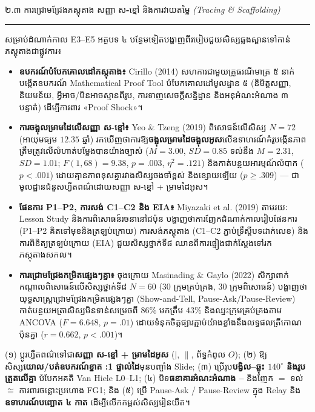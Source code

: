 \documentclass[a4paper,12pt]{article}
\newcommand{\en}[1]{{\TimesEn #1}}
\newcommand{\enbf}[1]{{\TimesEn\textbf{#1}}}
\newcommand{\enit}[1]{{\TimesEn\textit{#1}}}
\newcommand{\cnum}[1]{{\fontsize{10.5pt}{12pt}\selectfont\ding{\numexpr181+#1\relax}}}
\newcommand{\cg}{\ensuremath{\cong}}
\newcommand{\subsec}[1]{%
  \Needspace{1.3cm}%
  \vspace{0pt}%
  {\muol\fontsize{11.5pt}{18.5pt}\selectfont #1}\par
  \vspace{1pt}\hrule height 0.5pt\vspace{2pt}%
}
\begin{document}
\subsec{២.៣ ការជ្រោមជ្រែងភស្តុតាង សញ្ញា ស\enbf{-}ខ្មៅ និងការវាយតម្លៃ \enit{(Tracing \& Scaffolding)}}

សម្រាប់ដំណាក់កាល \en{E3--E5} អត្ថបទ ៤ បន្ថែមទៀតបង្ហាញពីរបៀបជួយសិស្សឆ្លងស្ពានទៅកាន់ភស្តុតាងជាផ្លូវការ៖
\begin{itemize}[leftmargin=0.50cm, topsep=3pt, itemsep=4pt, parsep=0pt]
  \item \textbf{ឧបករណ៍បំបែកគោលដៅភស្តុតាង៖} \en{Cirillo (2014)} សហការជាមួយគ្រូធរណីមាត្រ ៥ នាក់ បង្កើតឧបករណ៍ \en{Mathematical Proof Tool} បំបែកគោលដៅមូលដ្ឋាន ៥ (និមិត្តសញ្ញា, និយមន័យ, អ្វីអាច/មិនអាចស្មានពីរូប, ការទាញសេចក្ដីសន្និដ្ឋាន និងអនុអំណះអំណាង ៣ បន្ទាត់) ដើម្បីការពារ «\en{Proof Shock}»។
  \item \textbf{ការចង្អុលម្រាមដៃលើសញ្ញា ស-ខ្មៅ៖} \en{Yeo \& Tzeng (2019)} ពិសោធន៍លើសិស្ស $N = 72$ (អាយុមធ្យម $12.35$ ឆ្នាំ) រកឃើញថាការឱ្យ\textbf{ចង្អុលម្រាមដៃចង្អុលអូស}លើឧទាហរណ៍គំរូបង្កើនភាពត្រឹមត្រូវលើលំហាត់បម្លែងបានយ៉ាងច្បាស់ ($M = 3.00$, $SD = 0.85$ ទល់នឹង $M = 2.31$, $SD = 1.01$; $F(1, 68) = 9.38$, $p = .003$, $\eta^2 = .121$) និងកាត់បន្ថយអារម្មណ៍លំបាក ($p < .001$) ដោយគ្មានភាពខុសគ្នារវាងសិស្សចងចាំខ្ពស់ និងខ្សោយឡើយ ($p \ge .309$) — ជាមូលដ្ឋានជំនួសហ្វឺតពណ៌ដោយសញ្ញា ស-ខ្មៅ + ម្រាមដៃអូស។
  \item \textbf{ផែនការ \en{P1--P2}, ការសង់ \en{C1--C2} និង \en{EIA}៖} \en{Miyazaki et al. (2019)} តាមរយៈ \en{Lesson Study} និងការពិសោធន៍រចនានៅជប៉ុន បង្ហាញថាការញែកដំណាក់កាលរៀបផែនការ (\en{P1--P2} គិតទៅមុខនិងត្រឡប់ក្រោយ) ការសង់ភស្តុតាង (\en{C1--C2} ភ្ជាប់ទ្រឹស្ដីបទដាក់លេខ) និងការពិនិត្យត្រឡប់ក្រោយ (\en{EIA}) ជួយសិស្សថ្នាក់ទី៨ ឈានពីការផ្ទៀងជាក់ស្ដែងទៅរកភស្តុតាងសកល។
  \item \textbf{ការជ្រោមជ្រែងកម្រិតផ្សេងៗគ្នា៖} ចុងក្រោយ \en{Masinading \& Gaylo (2022)} សិក្សាពាក់កណ្ដាលពិសោធន៍លើសិស្សថ្នាក់ទី៨ $N = 60$ ($30$ ក្រុមគ្រប់គ្រង, $30$ ក្រុមពិសោធន៍) បង្ហាញថាយុទ្ធសាស្ត្រជ្រោមជ្រែងកម្រិតផ្សេងៗគ្នា (\en{Show-and-Tell, Pause-Ask/Pause-Review}) កាត់បន្ថយអត្រាសិស្សមិនទាន់សម្រេចពី $86\%$ មកត្រឹម $43\%$ និងឈ្នះក្រុមគ្រប់គ្រងតាម \en{ANCOVA} ($F = 6.648$, $p = .01$) ដោយទំនុកចិត្តផ្សារភ្ជាប់យ៉ាងខ្លាំងនឹងលទ្ធផលត្រីកោណប៉ុនគ្នា ($r = 0.662$, $p < .001$)។
\end{itemize}

\begin{tcolorbox}[
  enhanced, breakable, sharp corners, colback=panelgray, colframe=black,
  colbacktitle=black!12, coltitle=black, titlerule=0.7pt,
  fonttitle=\fontsize{11pt}{17pt}\selectfont,
  fontupper=\fontsize{11.5pt}{18.2pt}\selectfont,
  title={\muol សំយោគគោលការណ៍រចនា ៥ ចំណុចសម្រាប់មេរៀន \enbf{SAS} ៥០ នាទី},
  boxrule=0.95pt, top=6pt, bottom=6pt, left=9pt, right=9pt,
  toptitle=4pt, bottomtitle=4pt, before skip=8pt, after skip=8pt
]
  (១) ប្ដូរហ្វឺតពណ៌ទៅជា\textbf{សញ្ញា ស-ខ្មៅ + ម្រាមដៃអូស} ($|$, $\parallel$, ព័ទ្ធកំពូល $O$);
  (២) ឱ្យសិស្ស\textbf{យោល/បត់ឧបករណ៍ខ្នាត \en{1:1} ផ្ទាល់ដៃ}មុនបញ្ចាំង \en{Slide};
  (៣) ប្រើរូប\textbf{បង្វិល--ឆ្លុះ $140^\circ$ និងរូបត្រួតលើគ្នា} បំបែកអគតិ \en{Van Hiele L0--L1};
  (៤) បិទ\textbf{ធនាគារអំណះអំណាង \cnum{1}--\cnum{5}} និងញែក $=$ ទល់ $\cg$ ការពារចន្លោះប្រហោង \en{FG1};
  និង (៥) ប្រើ \en{Pause-Ask / Pause-Review} ក្នុង \en{Relay} និង\textbf{ឧទាហរណ៍បញ្ឆោត ៤ កាត} ដើម្បីលើកកម្ពស់សិស្សរៀនយឺត។
\end{tcolorbox}
\end{document}
